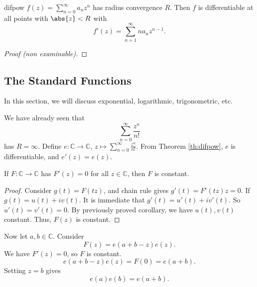 \leavevmode
\begin{theorem}{}{difpow}
    \(f(z) = \sum\limits_{n=0}^{\infty} a_n z^n\) has radius convergence \(R\). Then \(f\) is differentiable at all points with \(\abs{z} < R\) with
    \[
        f'(z) = \sum\limits_{n=1}^{\infty} n a_n z^{n - 1}.
    \]
\end{theorem}
\begin{proof}[Proof (non examinable)]
\end{proof}
\subsection{The Standard Functions}
In this section, we will discuss exponential, logarithmic, trigonometric, etc.

We have already seen that
\[
    \sum\limits_{n=0}^{\infty} \frac{z^n}{n!}
\]
has \(R = \infty\). Define \(e: \mathbb{C} \to \mathbb{C}\), \(z \mapsto \sum\limits_{n=0}^{\infty} \frac{z^n}{n!}\). From Theorem \eqref{th:difpow}, \(e\) is differentiable, and \(e'(z) = e(z)\).

If \(F: \mathbb{C}\to \mathbb{C}\) has \(F'(z) = 0\) for all \(z \in \mathbb{C}\), then \(F\) is constant.
\begin{proof}
    Consider \(g(t) = F(tz)\), and chain rule gives \(g'(t) = F'(tz)z = 0\). If \(g(t) = u(t) + iv(t)\). It is immediate that \(g'(t) = u'(t) + i v'(t)\). So \(u'(t) = v'(t) = 0\). By previously proved corollary, we have \(u(t), v(t)\) constant. Thus, \(F(z)\) is constant.
\end{proof}

Now let \(a, b \in \mathbb{C}\). Consider
\[
    F(z) = e(a + b - z)e(z).
\]
We have \(F'(z) = 0\), so \(F\) is constant.
\[
    e(a + b - z)e(z) = F(0) = e(a + b).
\]
Setting \(z = b\) gives
\[
    e(a)e(b) = e(a + b).
\]
